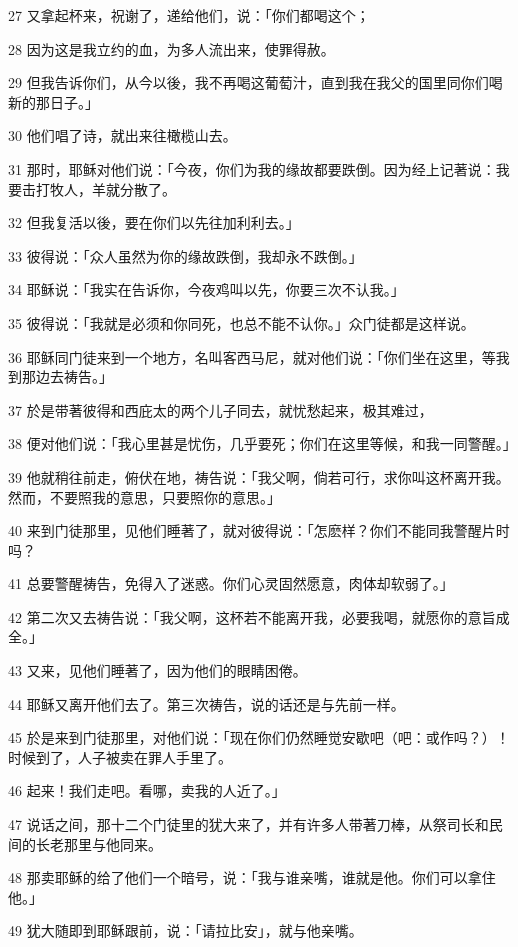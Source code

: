 \par 27 又拿起杯来，祝谢了，递给他们，说：「你们都喝这个；
\par 28 因为这是我立约的血，为多人流出来，使罪得赦。
\par 29 但我告诉你们，从今以後，我不再喝这葡萄汁，直到我在我父的国里同你们喝新的那日子。」
\par 30 他们唱了诗，就出来往橄榄山去。
\par 31 那时，耶稣对他们说：「今夜，你们为我的缘故都要跌倒。因为经上记著说：我要击打牧人，羊就分散了。
\par 32 但我复活以後，要在你们以先往加利利去。」
\par 33 彼得说：「众人虽然为你的缘故跌倒，我却永不跌倒。」
\par 34 耶稣说：「我实在告诉你，今夜鸡叫以先，你要三次不认我。」
\par 35 彼得说：「我就是必须和你同死，也总不能不认你。」众门徒都是这样说。
\par 36 耶稣同门徒来到一个地方，名叫客西马尼，就对他们说：「你们坐在这里，等我到那边去祷告。」
\par 37 於是带著彼得和西庇太的两个儿子同去，就忧愁起来，极其难过，
\par 38 便对他们说：「我心里甚是忧伤，几乎要死；你们在这里等候，和我一同警醒。」
\par 39 他就稍往前走，俯伏在地，祷告说：「我父啊，倘若可行，求你叫这杯离开我。然而，不要照我的意思，只要照你的意思。」
\par 40 来到门徒那里，见他们睡著了，就对彼得说：「怎麽样？你们不能同我警醒片时吗？
\par 41 总要警醒祷告，免得入了迷惑。你们心灵固然愿意，肉体却软弱了。」
\par 42 第二次又去祷告说：「我父啊，这杯若不能离开我，必要我喝，就愿你的意旨成全。」
\par 43 又来，见他们睡著了，因为他们的眼睛困倦。
\par 44 耶稣又离开他们去了。第三次祷告，说的话还是与先前一样。
\par 45 於是来到门徒那里，对他们说：「现在你们仍然睡觉安歇吧（吧：或作吗？）！时候到了，人子被卖在罪人手里了。
\par 46 起来！我们走吧。看哪，卖我的人近了。」
\par 47 说话之间，那十二个门徒里的犹大来了，并有许多人带著刀棒，从祭司长和民间的长老那里与他同来。
\par 48 那卖耶稣的给了他们一个暗号，说：「我与谁亲嘴，谁就是他。你们可以拿住他。」
\par 49 犹大随即到耶稣跟前，说：「请拉比安」，就与他亲嘴。
